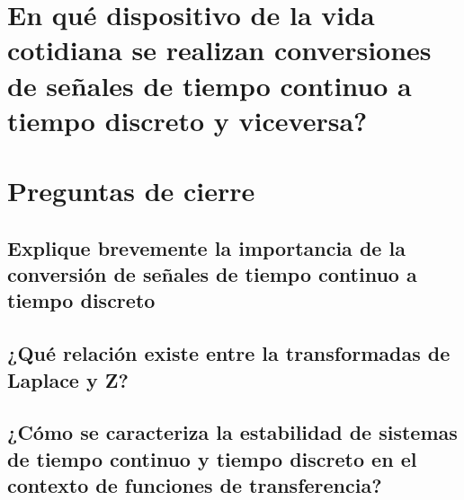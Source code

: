 \section{En qué dispositivo de la vida cotidiana se realizan conversiones de señales de tiempo continuo a tiempo discreto y viceversa?}

\section{Preguntas de cierre}

\subsection{Explique brevemente la importancia de la conversión de señales de tiempo continuo a tiempo discreto}
\subsection{¿Qué relación existe entre la transformadas de Laplace y Z?}
\subsection{¿Cómo se caracteriza la estabilidad de sistemas de tiempo continuo y tiempo discreto en el contexto de funciones de transferencia?}